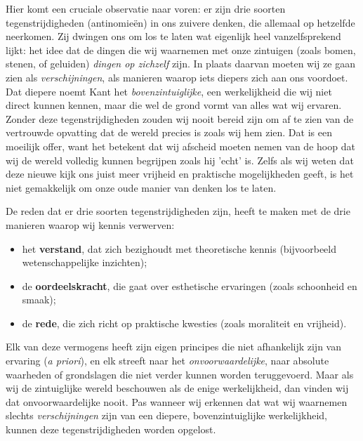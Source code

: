 \begin{mdframed}[leftmargin=0pt,rightmargin=0pt,backgroundcolor=blue!6,linecolor=white,innertopmargin=6pt,innerbottommargin=6pt]

Hier komt een cruciale observatie naar voren: er zijn drie soorten tegenstrijdigheden (antinomieën) in ons zuivere denken, die allemaal op hetzelfde neerkomen. Zij dwingen ons om los te laten wat eigenlijk heel vanzelfsprekend lijkt: het idee dat de dingen die wij waarnemen met onze zintuigen (zoals bomen, stenen, of geluiden) \textit{dingen op zichzelf} zijn. In plaats daarvan moeten wij ze gaan zien als \textit{verschijningen}, als manieren waarop iets diepers zich aan ons voordoet. Dat diepere noemt Kant het \textit{bovenzintuiglijke}, een werkelijkheid die wij niet direct kunnen kennen, maar die wel de grond vormt van alles wat wij ervaren. Zonder deze tegenstrijdigheden zouden wij nooit bereid zijn om af te zien van de vertrouwde opvatting dat de wereld precies is zoals wij hem zien. Dat is een moeilijk offer, want het betekent dat wij afscheid moeten nemen van de hoop dat wij de wereld volledig kunnen begrijpen zoals hij 'echt' is. Zelfs als wij weten dat deze nieuwe kijk ons juist meer vrijheid en praktische mogelijkheden geeft, is het niet gemakkelijk om onze oude manier van denken los te laten.

De reden dat er drie soorten tegenstrijdigheden zijn, heeft te maken met de drie manieren waarop wij kennis verwerven:
\begin{itemize}
    \item het \textbf{verstand}, dat zich bezighoudt met theoretische kennis (bijvoorbeeld wetenschappelijke inzichten);
    \item de \textbf{oordeelskracht}, die gaat over esthetische ervaringen (zoals schoonheid en smaak);
    \item de \textbf{rede}, die zich richt op praktische kwesties (zoals moraliteit en vrijheid).
\end{itemize}
Elk van deze vermogens heeft zijn eigen principes die niet afhankelijk zijn van ervaring (\textit{a priori}), en elk streeft naar het \textit{onvoorwaardelijke}, naar absolute waarheden of grondslagen die niet verder kunnen worden teruggevoerd. Maar als wij de zintuiglijke wereld beschouwen als de enige werkelijkheid, dan vinden wij dat onvoorwaardelijke nooit. Pas wanneer wij erkennen dat wat wij waarnemen slechts \textit{verschijningen} zijn van een diepere, bovenzintuiglijke werkelijkheid, kunnen deze tegenstrijdigheden worden opgelost.


\end{mdframed}
